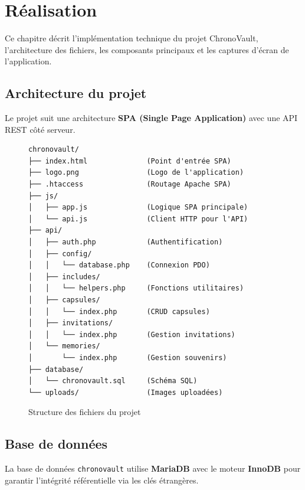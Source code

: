 \documentclass[12pt,a4paper]{report}
\begin{document}
\chapter{Réalisation}

Ce chapitre décrit l'implémentation technique du projet ChronoVault, l'architecture des fichiers, les composants principaux et les captures d'écran de l'application.

\section{Architecture du projet}

Le projet suit une architecture \textbf{SPA (Single Page Application)} avec une API REST côté serveur.

\begin{figure}[H]
    \centering
    \begin{tcolorbox}[colback=codebg, colframe=codeframe, width=0.75\textwidth, title={\textbf{Arborescence du projet}}]
        \small
\begin{verbatim}
chronovault/
├── index.html              (Point d'entrée SPA)
├── logo.png                (Logo de l'application)
├── .htaccess               (Routage Apache SPA)
├── js/
│   ├── app.js              (Logique SPA principale)
│   └── api.js              (Client HTTP pour l'API)
├── api/
│   ├── auth.php            (Authentification)
│   ├── config/
│   │   └── database.php    (Connexion PDO)
│   ├── includes/
│   │   └── helpers.php     (Fonctions utilitaires)
│   ├── capsules/
│   │   └── index.php       (CRUD capsules)
│   ├── invitations/
│   │   └── index.php       (Gestion invitations)
│   └── memories/
│       └── index.php       (Gestion souvenirs)
├── database/
│   └── chronovault.sql     (Schéma SQL)
└── uploads/                (Images uploadées)
\end{verbatim}
    \end{tcolorbox}
    \caption{Structure des fichiers du projet}
\end{figure}


\section{Base de données}

La base de données \texttt{chronovault} utilise \textbf{MariaDB} avec le moteur \textbf{InnoDB} pour garantir l'intégrité référentielle via les clés étrangères.
\end{document}
